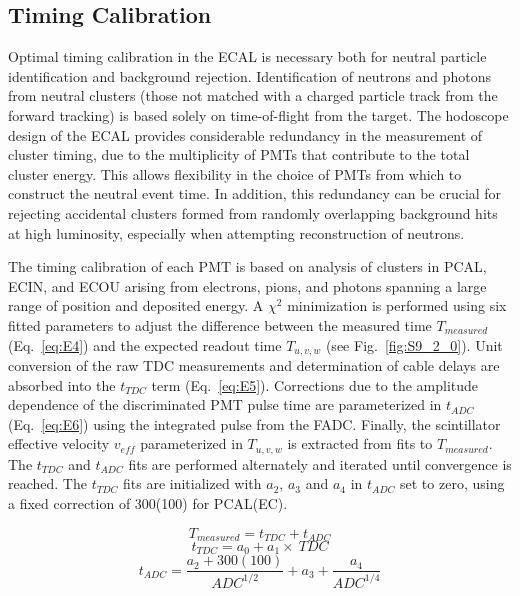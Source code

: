 \subsection{Timing Calibration}

Optimal timing calibration in the ECAL is necessary both for neutral particle identification and background rejection.
Identification of neutrons and photons from neutral clusters (those not matched with a charged particle track from
the forward tracking) is based solely on time-of-flight from the target. The hodoscope design of the ECAL provides
considerable redundancy in the measurement of cluster timing, due to the multiplicity of PMTs that contribute to the
total cluster energy. This allows flexibility in the choice of PMTs from which to construct the neutral event time. In
addition, this redundancy can be crucial for rejecting accidental clusters formed from randomly overlapping
background hits at high luminosity, especially when attempting reconstruction of neutrons. 

The timing calibration of each PMT is based on analysis of clusters in PCAL, ECIN, and ECOU arising from electrons,
pions, and photons spanning a large range of position and deposited energy. A $\chi^2$ minimization is performed
using six fitted parameters to adjust the difference between the measured time $T_{measured}$ (Eq.~\ref{eq:E4})
and the expected readout time $T_{u,v,w}$ (see Fig.~\ref{fig:S9_2_0}). Unit conversion of the raw TDC measurements
and determination of cable delays are absorbed into the $t_{TDC}$ term (Eq.~\ref{eq:E5}). Corrections due to the
amplitude dependence of the discriminated PMT pulse time are parameterized in $t_{ADC}$ (Eq.~\ref{eq:E6}) using
the integrated pulse from the FADC. Finally, the scintillator effective velocity $v_{eff}$ parameterized in $T_{u,v,w}$
is extracted from fits to $T_{measured}$. The $t_{TDC}$ and $t_{ADC}$ fits are performed alternately and iterated
until convergence is reached. The $t_{TDC}$ fits are initialized with $a_2$, $a_3$ and $a_4$ in $t_{ADC}$ set to zero,
using a fixed correction of 300(100) for PCAL(EC).

\begin{equation}
T_{measured}=t_{TDC}+t_{ADC} \label{eq:E4}
\end{equation}
\begin{equation}
t_{TDC}=a_0+a_1\times~TDC \label{eq:E5}
\end{equation}
\begin{equation}
t_{ADC}=\frac{a_2+300(100)}{ADC^{1/2}}+a_3+\frac{a_4}{ADC^{1/4}} \label{eq:E6}
\end{equation}

